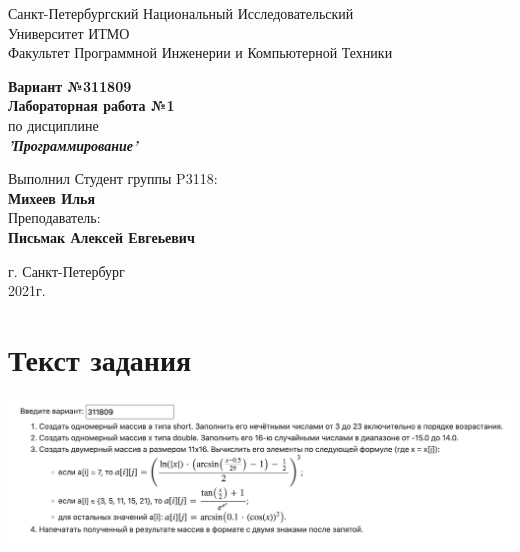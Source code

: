 \documentclass[12pt,onecolumn]{article}
\begin{document}
\begin{center}
    Санкт-Петербургский Национальный Исследовательский\\ 
    Университет ИТМО\\
    Факультет Программной Инженерии и Компьютерной Техники\\
\end{center}
\vspace{1cm}


\begin{center}
    \large \textbf{Вариант №311809}\\
    \textbf{Лабораторная работа №1}\\
    по дисциплине\\
    \textbf{\textit{'Программирование'}}
\end{center}

\vspace{3cm}
\begin{flushright}
  Выполнил Студент  группы P3118: \\
  \textbf{Михеев Илья}\\
  Преподаватель: \\
  \textbf{Письмак Алексей Евгеьевич}\\
\end{flushright}

\vspace{14cm}
\begin{center}
    г. Санкт-Петербург\\
    2021г.
\end{center}

\newpage

\tableofcontents

\vspace{1cm}

\section{Текст задания}
\includegraphics[width=\columnwidth]{task.png}
\end{document}
